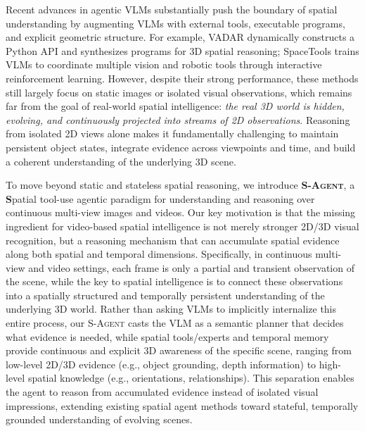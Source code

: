 \documentclass{llmxive}
\begin{document}
Recent advances in agentic VLMs substantially push the boundary of spatial understanding by augmenting VLMs with external tools, executable programs, and explicit geometric structure. 
% 
For example, VADAR \citep{vadar} dynamically constructs a Python API and synthesizes programs for 3D spatial reasoning; SpaceTools \citep{spacetools} trains VLMs to coordinate multiple vision and robotic tools through interactive reinforcement learning. %
% 
However, despite their strong performance, these methods still largely focus on static images or isolated visual observations, which remains far from the goal of real-world spatial intelligence: \textit{the real 3D world is hidden, evolving, and continuously projected into streams of 2D observations}. 
% 
Reasoning from isolated 2D views alone makes it fundamentally challenging to maintain persistent object states, integrate evidence across viewpoints and time, and build a coherent understanding of the underlying 3D scene.

To move beyond static and stateless spatial reasoning, we introduce \textbf{\textsc{S-Agent}}, a \textbf{S}patial tool-use agentic paradigm for understanding and reasoning over continuous multi-view images and videos. 
% 
Our key motivation is that the missing ingredient for video-based spatial intelligence is not merely stronger 2D/3D visual recognition, but a reasoning mechanism that can accumulate spatial evidence along both spatial and temporal dimensions. 
% 
Specifically, in continuous multi-view and video settings, each frame is only a partial and transient observation of the scene, while the key to spatial intelligence is to connect these observations into a spatially structured and temporally persistent understanding of the underlying 3D world.
% 
Rather than asking VLMs to implicitly internalize this entire process, our \textsc{S-Agent} casts the VLM as a semantic planner that decides what evidence is needed, while spatial tools/experts and temporal memory provide continuous and explicit 3D awareness of the specific scene, ranging from low-level 2D/3D evidence (e.g., object grounding, depth information) to high-level spatial knowledge (e.g., orientations, relationships).
% 
This separation enables the agent to reason from accumulated evidence instead of isolated visual impressions, extending existing spatial agent methods toward stateful, temporally grounded understanding of evolving scenes.
% 
\end{document}
